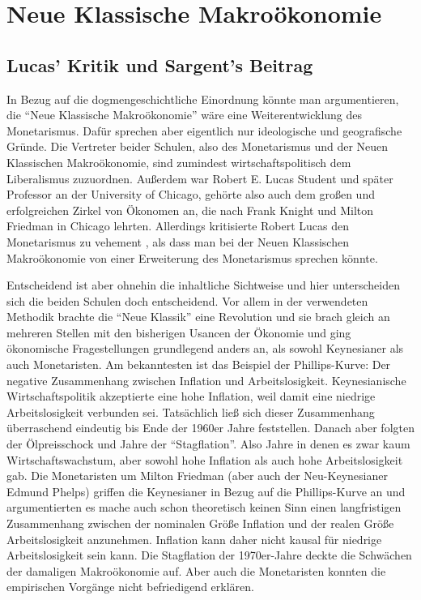 %
%
%

\chapter{Neue Klassische Makroökonomie}
\label{Neue Makro}

\section{Lucas' Kritik und Sargent's Beitrag}
In Bezug auf die dogmengeschichtliche Einordnung könnte man argumentieren, die "`Neue Klassische Makroökonomie"' wäre eine Weiterentwicklung des Monetarismus. Dafür sprechen aber eigentlich nur ideologische und geografische Gründe. Die Vertreter beider Schulen, also des Monetarismus und der Neuen Klassischen Makroökonomie, sind zumindest wirtschaftspolitisch dem Liberalismus zuzuordnen. Außerdem war Robert E. Lucas Student und später Professor an der University of Chicago, gehörte also auch dem großen und erfolgreichen Zirkel von Ökonomen an, die nach Frank Knight und Milton Friedman in Chicago lehrten. Allerdings kritisierte Robert Lucas den Monetarismus zu vehement \parencite[S. 121]{Lucas1972}, als dass man bei der Neuen Klassischen Makroökonomie von einer Erweiterung des Monetarismus sprechen könnte.  

Entscheidend ist aber ohnehin die inhaltliche Sichtweise und hier unterscheiden sich die beiden Schulen doch entscheidend. Vor allem in der verwendeten Methodik brachte die "`Neue Klassik"' eine Revolution und sie brach gleich an mehreren Stellen mit den bisherigen Usancen der Ökonomie und ging ökonomische Fragestellungen grundlegend anders an, als sowohl Keynesianer als auch Monetaristen. Am bekanntesten ist das Beispiel der Phillips-Kurve: Der negative Zusammenhang zwischen Inflation und Arbeitslosigkeit. Keynesianische Wirtschaftspolitik akzeptierte eine hohe Inflation, weil damit eine niedrige Arbeitslosigkeit verbunden sei. Tatsächlich ließ sich dieser Zusammenhang überraschend eindeutig bis Ende der 1960er Jahre feststellen. Danach aber folgten der Ölpreisschock und Jahre der "`Stagflation"'. Also Jahre in denen es zwar kaum Wirtschaftswachstum, aber sowohl hohe Inflation als auch hohe Arbeitslosigkeit gab. Die Monetaristen um Milton Friedman (aber auch der Neu-Keynesianer Edmund Phelps) griffen die Keynesianer in Bezug auf die Phillips-Kurve an und argumentierten es mache auch schon theoretisch keinen Sinn einen langfristigen Zusammenhang zwischen der nominalen Größe Inflation und der realen Größe Arbeitslosigkeit anzunehmen. Inflation kann daher nicht kausal für niedrige Arbeitslosigkeit sein kann. Die Stagflation der 1970er-Jahre deckte die Schwächen der damaligen Makroökonomie auf. Aber auch die Monetaristen konnten die empirischen Vorgänge nicht befriedigend erklären.

